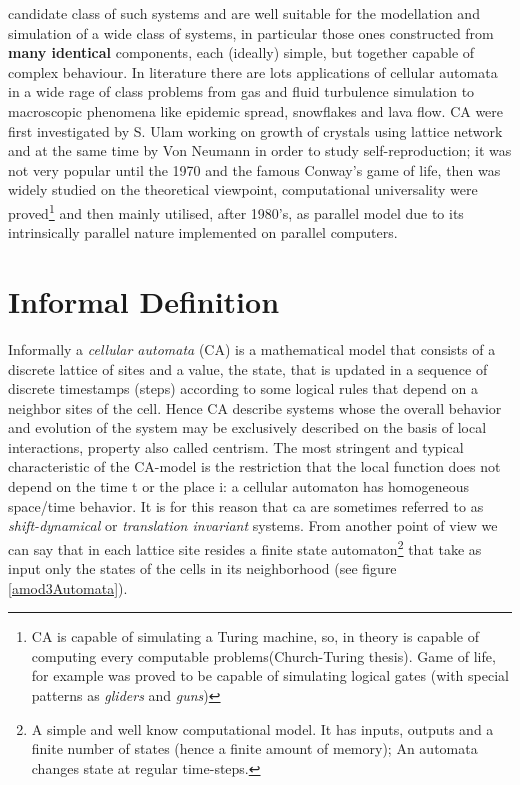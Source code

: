 candidate class of such systems and are well suitable for the modellation and
simulation of a wide class of systems, in particular those ones constructed from
\textbf{many identical} components, each (ideally) simple, but together capable
of complex behaviour\cite{Toffoli1984}\cite{toffoli1987}. In literature there
are lots applications of cellular automata in a wide rage of class problems from
gas\cite{Frisch1986} and fluid turbulence\cite{Succi1991} simulation to
macroscopic phenomena\cite{Gregorio1999} like epidemic
spread\cite{Sirakoulis2000}, snowflakes and lava
flow\cite{Crisci2004}\cite{Spataro2010}.
CA were first investigated by S. Ulam working on growth of crystals using
lattice network and at the same time by Von Neumann in order to study
self-reproduction\cite{Neumann1966}; it was not very popular until the 1970 and
the famous Conway's game of life\cite{Conway1970}, then was widely studied on
the theoretical viewpoint, computational universality were
proved\footnote{CA is capable of simulating a Turing machine, so, in theory is
capable of computing every computable problems(Church-Turing
thesis). Game of life, for example was proved to be capable
of simulating logical gates (with special patterns as
\textit{gliders} and \textit{guns})}\cite{Thatcher1970} and then mainly
utilised, after 1980's, as parallel model due to its intrinsically parallel nature implemented on parallel computers\cite{Margolus1986}.




\section{Informal Definition}

Informally a \emph{cellular automata} (CA) is a mathematical model that
consists of a discrete lattice of sites  and a value, the state, that is
updated in a sequence of discrete timestamps (steps) according to some logical rules that
depend on a neighbor  sites of the cell. Hence CA describe systems whose the
overall behavior and evolution of the system may be exclusively described on the basis of local
interactions\cite{wolfram1984}, property also called centrism.
The most stringent and typical characteristic of the CA-model is the restriction
that the local function does not depend on the time t or the place i: a cellular automaton has homogeneous
space/time behavior. It is for this reason that ca are sometimes referred to as
\textit{shift-dynamical} or \textit{translation invariant} systems. From another
point of view we can say that in each lattice site resides a finite state
automaton\footnote{A simple and well know computational model. It has inputs,
outputs and a finite number of states (hence a finite amount of memory);
An automata changes state at regular time-steps.}  that take as
input only the states of the cells in its neighborhood (see figure \ref{amod3Automata}).

